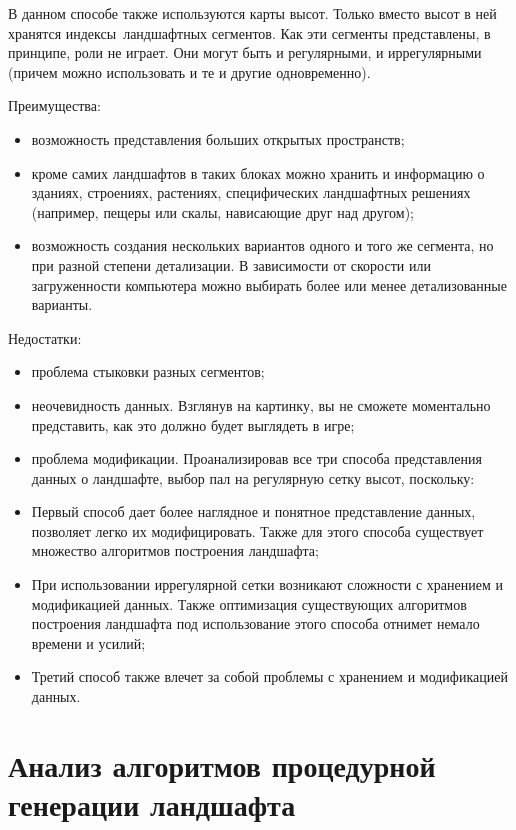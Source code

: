 В данном способе также используются карты высот. Только вместо высот в ней хранятся индексы ландшафтных сегментов. Как эти сегменты представлены, в принципе, роли не играет. Они могут быть и регулярными, и иррегулярными (причем можно использовать и те и другие одновременно).

\clearpage

Преимущества: 

\begin{itemize}[label=--]
	\item возможность представления больших открытых пространств;
	\item кроме самих ландшафтов в таких блоках можно хранить и информацию о зданиях, строениях, растениях, специфических ландшафтных решениях (например, пещеры или скалы, нависающие друг над другом);
	\item возможность создания нескольких вариантов одного и того же сегмента, но при разной степени детализации. В зависимости от скорости или загруженности компьютера можно выбирать более или менее детализованные варианты.
\end{itemize}

Недостатки:

\begin{itemize}[label=--]
	\item проблема стыковки разных сегментов;
	\item неочевидность данных. Взглянув на картинку, вы не сможете моментально представить, как это должно будет выглядеть в игре;
	\item проблема модификации.
	Проанализировав все три способа представления данных о ландшафте, выбор пал на регулярную сетку высот, поскольку: 
	\item Первый способ дает более наглядное и понятное представление данных, позволяет легко их модифицировать. Также для этого способа существует множество алгоритмов построения ландшафта;
	\item При использовании иррегулярной сетки возникают сложности с хранением и модификацией данных. Также оптимизация существующих алгоритмов построения ландшафта под использование этого способа отнимет немало времени и усилий;
	\item Третий способ также влечет за собой проблемы с хранением и модификацией данных.
\end{itemize}

\clearpage

\section{Анализ алгоритмов процедурной генерации ландшафта}

